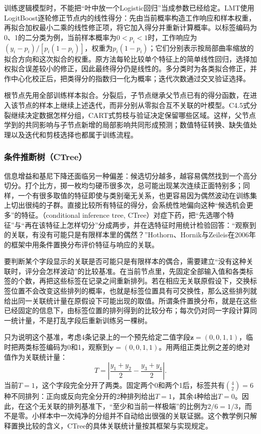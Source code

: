 训练逻辑模型时，不能把“叶中放一个Logistic回归”当成参数已经给定。LMT使用LogitBoost逐轮修正节点内的线性得分：先由当前概率构造工作响应和样本权重，再拟合加权最小二乘的线性修正项，将它加入得分并重新计算概率。以标签编码为0、1的二分类为例，当前样本概率为$0<p_i<1$时，工作响应为$(y_i-p_i)/[p_i(1-p_i)]$，权重为$p_i(1-p_i)$；它们分别表示按局部曲率缩放的拟合方向和这次拟合的权重。原方法每轮比较单个特征上的简单线性回归，选择加权拟合误差较小的修正，因此最终得分仍是线性的。多分类时为各类拟合修正，并作中心化校正后，把类得分的指数归一化为概率；迭代次数通过交叉验证选择。

根节点先用全部训练样本拟合。分裂后，子节点继承父节点已有的得分函数，在进入该节点的样本上继续上述迭代，而非分别从零拟合互不关联的叶模型。C4.5式分裂继续决定数据怎样分组，CART式剪枝与验证决定保留哪些区域。这样，父节点学到的共同影响与子节点新增的局部影响共同形成预测；数值特征转换、缺失值处理以及迭代和剪枝选择也都属于训练流程。

\subsubsection{条件推断树（CTree）}

信息增益和基尼下降还面临另一种偏差：候选切分越多，越容易偶然找到一个高分切分。打个比方，掷一枚均匀硬币很多次，总可能出现某次连续正面特别多；同样，一个有很多取值的特征即使与类别毫无关系，也更容易因为偶然波动在训练集上切出很纯的子群。直接比较所有特征的得分，会系统性地偏向这种“候选机会更多”的特征。（conditional inference tree, CTree）对症下药，把“先选哪个特征”与“再在该特征上怎样切分”分成两步，并在选特征时用统计检验回答：“观察到的关联，有没有可能只是有限样本里的偶然？”Hothorn、Hornik与Zeileis在2006年的框架中用条件置换分布评价特征与响应的关联。

要判断某个字段显示的关联是否可能只是有限样本的偶合，需要建立“没有这种关联时，评分会怎样波动”的比较基准。在当前节点里，先固定全部输入值和各类标签的个数，再把这些标签在记录之间重新排列。若在相应无关联原假设下，交换标签位置不会改变这些排列的概率，也就是标签位置具有可交换性，那么这些排列就给出同一关联统计量在原假设下可能出现的取值。所谓条件置换分布，就是在这些已经固定的信息下，由标签位置的排列得到的比较分布；每次仍对同一字段计算同一统计量，不是打乱字段后重新训练另一棵树。

只为说明这个基准，考虑4条记录上的一个预先给定二值字段$\bm z=(0,0,1,1)$，临时把两类标签编码为0和1，观察到$\bm y=(0,0,1,1)$。用两组正类比例之差的绝对值作为关联统计量：
\[
  T=\left|\frac{y_1+y_2}{2}-\frac{y_3+y_4}{2}\right|.
\]
当前$T=1$，这个字段完全分开了两类。固定两个0和两个1后，标签共有$\binom42=6$种不同排列：正向或反向完全分开的2种排列给出$T=1$，其余4种给出$T=0$。因此，在这个无关联的排列基准下，“至少和当前一样极端”的比例为$2/6=1/3$，而不是零。小样本中一次纯净的分组并不自动给出很强的关联证据。这个教学例只解释置换比较的含义，CTree的具体关联统计量按其框架与实现规定。

